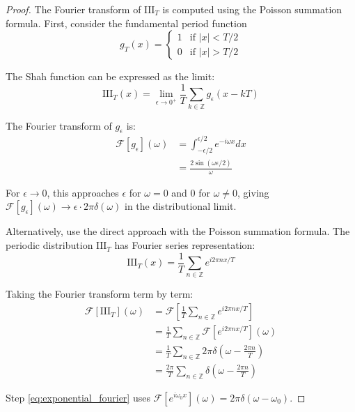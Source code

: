 \documentclass{article}
\begin{document}
\begin{proof}
The Fourier transform of $\text{III}_T$ is computed using the Poisson summation formula. First, consider the fundamental period function
\begin{equation}
\label{eq:fundamental_period}
g_T(x) = \begin{cases}
1 & \text{if } |x| < T/2 \\
0 & \text{if } |x| > T/2
\end{cases}
\end{equation}

The Shah function can be expressed as the limit:
\begin{equation}
\label{eq:shah_as_limit}
\text{III}_T(x) = \lim_{\epsilon \to 0^+} \frac{1}{T} \sum_{k \in \mathbb{Z}} g_\epsilon(x - kT)
\end{equation}

The Fourier transform of $g_\epsilon$ is:
\begin{align}
\mathcal{F}[g_\epsilon](\omega) &= \int_{-\epsilon/2}^{\epsilon/2} e^{-i\omega x} dx \label{eq:g_epsilon_fourier}\\
&= \frac{2\sin(\omega\epsilon/2)}{\omega} \label{eq:sinc_result}
\end{align}

For $\epsilon \to 0$, this approaches $\epsilon$ for $\omega = 0$ and $0$ for $\omega \neq 0$, giving $\mathcal{F}[g_\epsilon](\omega) \to \epsilon \cdot 2\pi\delta(\omega)$ in the distributional limit.

Alternatively, use the direct approach with the Poisson summation formula. The periodic distribution $\text{III}_T$ has Fourier series representation:
\begin{equation}
\label{eq:fourier_series_shah}
\text{III}_T(x) = \frac{1}{T} \sum_{n \in \mathbb{Z}} e^{i 2\pi n x / T}
\end{equation}

Taking the Fourier transform term by term:
\begin{align}
\mathcal{F}[\text{III}_T](\omega) &= \mathcal{F}\left[\frac{1}{T} \sum_{n \in \mathbb{Z}} e^{i 2\pi n x / T}\right] \label{eq:fourier_series_transform}\\
&= \frac{1}{T} \sum_{n \in \mathbb{Z}} \mathcal{F}[e^{i 2\pi n x / T}](\omega) \label{eq:linearity_fourier}\\
&= \frac{1}{T} \sum_{n \in \mathbb{Z}} 2\pi \delta\left(\omega - \frac{2\pi n}{T}\right) \label{eq:exponential_fourier}\\
&= \frac{2\pi}{T} \sum_{n \in \mathbb{Z}} \delta\left(\omega - \frac{2\pi n}{T}\right) \label{eq:factor_out_2pi}
\end{align}

Step \eqref{eq:exponential_fourier} uses $\mathcal{F}[e^{i\omega_0 x}](\omega) = 2\pi\delta(\omega - \omega_0)$.
\end{proof}
\end{document}
